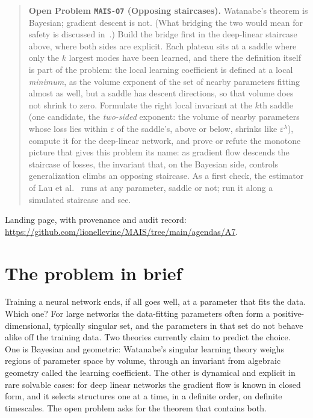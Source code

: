 \documentclass[11pt]{amsart}
\theoremstyle{plain}
\theoremstyle{definition}
\begin{document}
\begin{quote}
\textbf{Open Problem \texttt{MAIS-O7} (Opposing staircases).}
Watanabe's theorem is Bayesian; gradient descent is not. (What bridging the two would mean for safety is discussed in~\cite{lehalleur2025}.) Build the bridge first in the deep-linear staircase above, where both sides are explicit. Each plateau sits at a saddle where only the $k$ largest modes have been learned, and there the definition itself is part of the problem: the local learning coefficient is defined at a local \emph{minimum}, as the volume exponent of the set of nearby parameters fitting almost as well, but a saddle has descent directions, so that volume does not shrink to zero. Formulate the right local invariant at the $k$th saddle (one candidate, the \emph{two-sided} exponent: the volume of nearby parameters whose loss lies within $\varepsilon$ of the saddle's, above or below, shrinks like $\varepsilon^{\lambda}$), compute it for the deep-linear network, and prove or refute the monotone picture that gives this problem its name: as gradient flow descends the staircase of losses, the invariant that, on the Bayesian side, controls generalization climbs an opposing staircase. As a first check, the estimator of Lau et al.~\cite{lau2023} runs at any parameter, saddle or not; run it along a simulated staircase and see.
\end{quote}

\noindent Landing page, with provenance and audit record: \url{https://github.com/lionellevine/MAIS/tree/main/agendas/A7}.

\section{The problem in brief}\label{sec:brief}

Training a neural network ends, if all goes well, at a parameter that fits the data. Which one? For large networks the data-fitting parameters often form a positive-dimensional, typically singular set, and the parameters in that set do not behave alike off the training data. Two theories currently claim to predict the choice. One is Bayesian and geometric: Watanabe's singular learning theory weighs regions of parameter space by volume, through an invariant from algebraic geometry called the learning coefficient. The other is dynamical and explicit in rare solvable cases: for deep linear networks the gradient flow is known in closed form, and it selects structures one at a time, in a definite order, on definite timescales. The open problem asks for the theorem that contains both.
\end{document}
